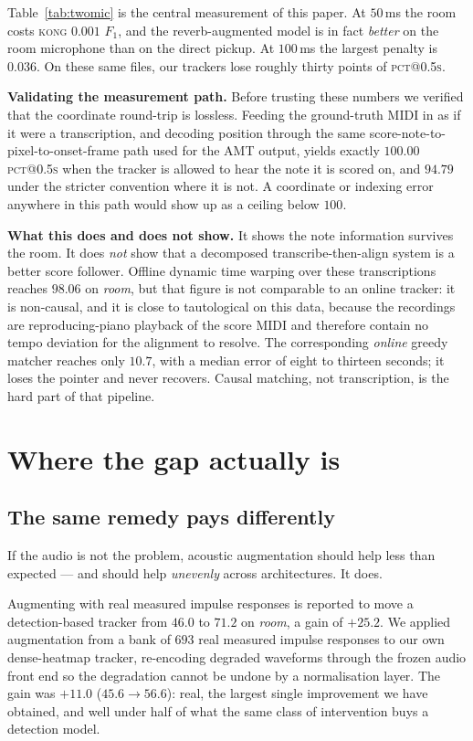 \documentclass{article}
\begin{document}
Table~\ref{tab:twomic} is the central measurement of this paper. At $50\,$ms
the room costs \textsc{kong} $0.001$ $F_1$, and the reverb-augmented model is
in fact \emph{better} on the room microphone than on the direct pickup. At
$100\,$ms the largest penalty is $0.036$. On these same files, our trackers
lose roughly thirty points of \textsc{pct@0.5s}.

\noindent\textbf{Validating the measurement path.} Before trusting these
numbers we verified that the coordinate round-trip is lossless. Feeding the
ground-truth MIDI in as if it were a transcription, and decoding position
through the same score-note-to-pixel-to-onset-frame path used for the AMT
output, yields exactly $100.00$ \textsc{pct@0.5s} when the tracker is allowed
to hear the note it is scored on, and $94.79$ under the stricter convention
where it is not. A coordinate or indexing error anywhere in this path would
show up as a ceiling below $100$.

\noindent\textbf{What this does and does not show.} It shows the note
information survives the room. It does \emph{not} show that a decomposed
transcribe-then-align system is a better score follower. Offline dynamic time
warping over these transcriptions reaches $98.06$ on \emph{room}, but that
figure is not comparable to an online tracker: it is non-causal, and it is
close to tautological on this data, because the recordings are reproducing-piano
playback of the score MIDI and therefore contain no tempo deviation for the
alignment to resolve. The corresponding \emph{online} greedy matcher reaches
only $10.7$, with a median error of eight to thirteen seconds; it loses the
pointer and never recovers. Causal matching, not transcription, is the hard
part of that pipeline.

\section{Where the gap actually is}
\label{sec:where}

\subsection{The same remedy pays differently}

If the audio is not the problem, acoustic augmentation should help less than
expected --- and should help \emph{unevenly} across architectures. It does.

Augmenting with real measured impulse responses is reported to move a
detection-based tracker from $46.0$ to $71.2$ on \emph{room}, a gain of
$+25.2$. We applied augmentation from a bank of $693$ real measured impulse
responses to our own dense-heatmap tracker, re-encoding degraded waveforms
through the frozen audio front end so the degradation cannot be undone by a
normalisation layer. The gain was $+11.0$ ($45.6 \rightarrow 56.6$): real, the
largest single improvement we have obtained, and well under half of what the
same class of intervention buys a detection model.
\end{document}
